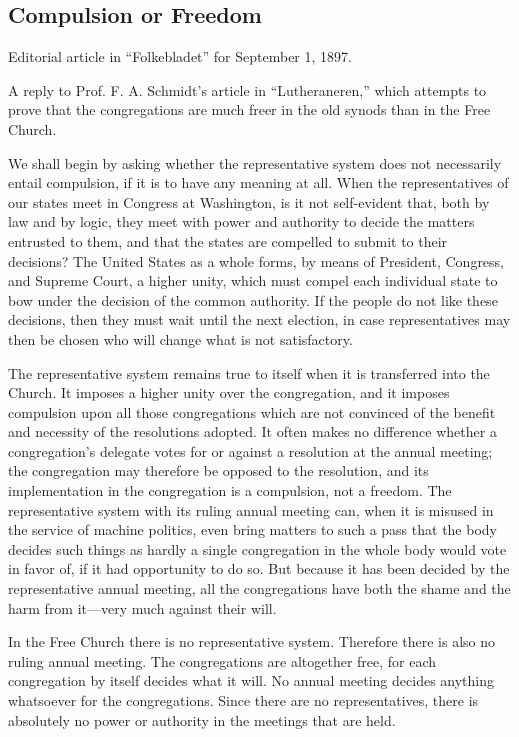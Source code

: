 
\subsection{Compulsion or Freedom}

Editorial article in “Folkebladet” for September 1, 1897.

A reply to Prof. F. A. Schmidt’s article in “Lutheraneren,” which attempts to prove that the congregations are much freer in the old synods than in the Free Church.

We shall begin by asking whether the representative system does not necessarily entail compulsion, if it is to have any meaning at all. When the representatives of our states meet in Congress at Washington, is it not self-evident that, both by law and by logic, they meet with power and authority to decide the matters entrusted to them, and that the states are compelled to submit to their decisions? The United States as a whole forms, by means of President, Congress, and Supreme Court, a higher unity, which must compel each individual state to bow under the decision of the common authority. If the people do not like these decisions, then they must wait until the next election, in case representatives may then be chosen who will change what is not satisfactory.

The representative system remains true to itself when it is transferred into the Church. It imposes a higher unity over the congregation, and it imposes compulsion upon all those congregations which are not convinced of the benefit and necessity of the resolutions adopted. It often makes no difference whether a congregation’s delegate votes for or against a resolution at the annual meeting; the congregation may therefore be opposed to the resolution, and its implementation in the congregation is a compulsion, not a freedom. The representative system with its ruling annual meeting can, when it is misused in the service of machine politics, even bring matters to such a pass that the body decides such things as hardly a single congregation in the whole body would vote in favor of, if it had opportunity to do so. But because it has been decided by the representative annual meeting, all the congregations have both the shame and the harm from it—very much against their will.

In the Free Church there is no representative system. Therefore there is also no ruling annual meeting. The congregations are altogether free, for each congregation by itself decides what it will. No annual meeting decides anything whatsoever for the congregations. Since there are no representatives, there is absolutely no power or authority in the meetings that are held.

